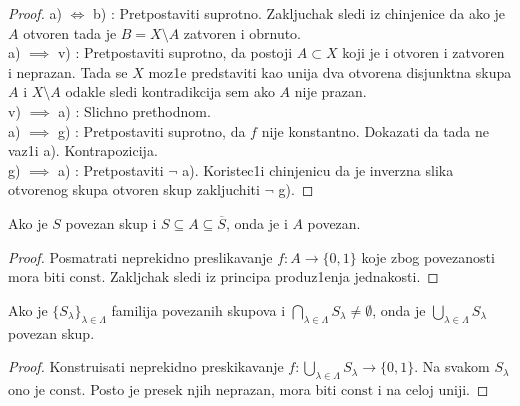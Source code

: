 \documentclass[a4paper,12pt]{article}
\newcommand{\psj}{\subseteq}
\newcommand{\const}{\mathrm{const}}
\begin{document}
\begin{proof}
a) $\Longleftrightarrow$ b) : Pretpostaviti suprotno. Zakljuchak sledi iz chinjenice da ako je $A$ otvoren tada je $B = X \setminus A$ zatvoren i obrnuto. \\ 
a) $\implies$ v) : Pretpostaviti suprotno, da postoji $A \subset X$ koji je i otvoren i zatvoren i neprazan. Tada se $X$ moz1e predstaviti kao unija dva otvorena disjunktna skupa $A$ i $X \setminus A$ odakle sledi kontradikcija sem ako $A$ nije prazan.
\\ 
v) $\implies$ a) : Slichno prethodnom.
\\
a) $\implies$ g) : Pretpostaviti suprotno, da $f$ nije konstantno. Dokazati da tada ne vaz1i a). Kontrapozicija.
\\
g) $\implies$ a) : Pretpostaviti $\neg$ a). Koristec1i chinjenicu da je inverzna slika otvorenog skupa otvoren skup zakljuchiti $\neg$ g).
\end{proof}

\begin{tvr}
Ako je $S$ povezan skup i $S \psj A \psj \overline{S}$, onda je i $A$ povezan.
\end{tvr}
\begin{proof}
Posmatrati neprekidno preslikavanje $f: A \to \{0, 1\}$ koje zbog povezanosti mora biti $\const$. Zakljchak sledi iz principa produz1enja jednakosti.
\end{proof}

\begin{tvr}
Ako je $\{S_{\lambda}\}_{\lambda \in \Lambda}$ familija povezanih skupova i $\bigcap_{\lambda \in \Lambda} S_{\lambda} \ne \emptyset$, onda je $\bigcup_{\lambda \in \Lambda} S_{\lambda}$ povezan skup.
\end{tvr}
\begin{proof}
Konstruisati neprekidno preskikavanje $f: \bigcup_{\lambda \in \Lambda} S_{\lambda} \to \{ 0, 1 \}$. Na svakom $S_\lambda$ ono je $\const$. Posto je presek njih neprazan, mora biti $\const$ i na celoj uniji.
\end{proof}
\end{document}
